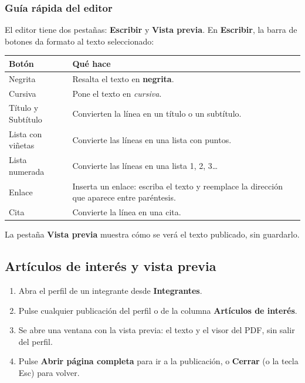\documentclass[11pt,a4paper]{article}
\newcommand{\boton}[1]{\textbf{\textcolor{siiisazul}{#1}}}
\begin{document}
\subsubsection*{Gu\'ia r\'apida del editor}
El editor tiene dos pesta\~nas: \boton{Escribir} y \boton{Vista previa}. En \boton{Escribir}, la barra de botones da
formato al texto seleccionado:

\begin{center}
\begin{tabular}{@{}p{3.6cm}p{10.4cm}@{}}
  \toprule
  \textbf{Bot\'on} & \textbf{Qu\'e hace}\\
  \midrule
  Negrita & Resalta el texto en \textbf{negrita}.\\
  Cursiva & Pone el texto en \emph{cursiva}.\\
  T\'itulo y Subt\'itulo & Convierten la l\'inea en un t\'itulo o un subt\'itulo.\\
  Lista con vi\~netas & Convierte las l\'ineas en una lista con puntos.\\
  Lista numerada & Convierte las l\'ineas en una lista 1, 2, 3\ldots\\
  Enlace & Inserta un enlace: escriba el texto y reemplace la direcci\'on que aparece entre par\'entesis.\\
  Cita & Convierte la l\'inea en una cita.\\
  \bottomrule
\end{tabular}
\end{center}

La pesta\~na \boton{Vista previa} muestra c\'omo se ver\'a el texto publicado, sin guardarlo.


\subsection{Art\'iculos de inter\'es y vista previa}
\begin{enumerate}
  \item Abra el perfil de un integrante desde \boton{Integrantes}.
  \item Pulse cualquier publicaci\'on del perfil o de la columna \boton{Art\'iculos de inter\'es}.
  \item Se abre una ventana con la vista previa: el texto y el visor del PDF, sin salir del perfil.
  \item Pulse \boton{Abrir p\'agina completa} para ir a la publicaci\'on, o \boton{Cerrar} (o la tecla Esc) para volver.
\end{enumerate}
\end{document}
